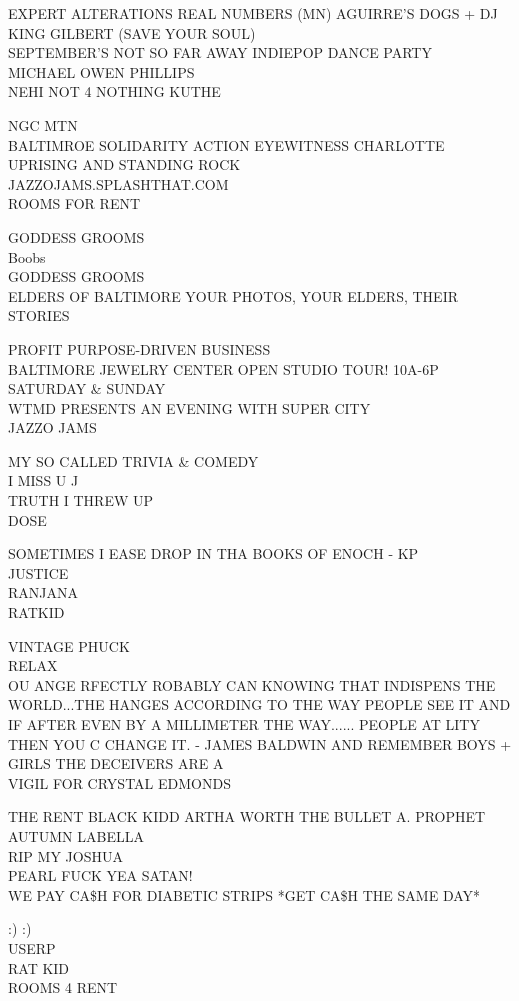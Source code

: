 \documentclass[10pt,letterpaper]{article}
\begin{document}
EXPERT ALTERATIONS REAL NUMBERS (MN) AGUIRRE'S DOGS + DJ KING GILBERT (SAVE YOUR SOUL)\\
SEPTEMBER'S NOT SO FAR AWAY INDIEPOP DANCE PARTY\\
MICHAEL OWEN PHILLIPS\\
NEHI NOT 4 NOTHING KUTHE

NGC MTN\\
BALTIMROE SOLIDARITY ACTION EYEWITNESS CHARLOTTE UPRISING AND STANDING ROCK\\
JAZZOJAMS.SPLASHTHAT.COM\\
ROOMS FOR RENT

GODDESS GROOMS\\
Boobs\\
GODDESS GROOMS\\
ELDERS OF BALTIMORE YOUR PHOTOS, YOUR ELDERS, THEIR STORIES

PROFIT PURPOSE{-}DRIVEN BUSINESS\\
BALTIMORE JEWELRY CENTER OPEN STUDIO TOUR!  10A{-}6P SATURDAY \& SUNDAY\\
WTMD PRESENTS AN EVENING WITH SUPER CITY\\
JAZZO JAMS

MY SO CALLED TRIVIA \& COMEDY\\
I MISS U J\\
TRUTH I THREW UP\\
DOSE

SOMETIMES I EASE DROP IN THA BOOKS OF ENOCH {-} KP\\
JUSTICE\\
RANJANA\\
RATKID

VINTAGE PHUCK\\
RELAX\\
OU ANGE RFECTLY ROBABLY CAN KNOWING THAT INDISPENS THE WORLD...THE HANGES ACCORDING TO THE WAY PEOPLE SEE IT AND IF AFTER EVEN BY A MILLIMETER THE WAY...... PEOPLE AT LITY THEN YOU C CHANGE IT. {-} JAMES BALDWIN AND REMEMBER BOYS + GIRLS THE DECEIVERS ARE A\\
VIGIL FOR CRYSTAL EDMONDS

THE RENT BLACK KIDD ARTHA WORTH THE BULLET A. PROPHET AUTUMN LABELLA\\
RIP MY JOSHUA\\
PEARL FUCK YEA SATAN!\\
WE PAY CA\$H FOR DIABETIC STRIPS *GET CA\$H THE SAME DAY*

:) :)\\
USERP\\
RAT KID\\
ROOMS 4 RENT
\end{document}
